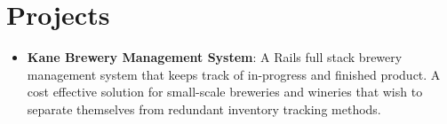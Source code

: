 \documentclass[letterpaper,11pt]{article}
\newcommand{\resumeItem}[2]{
  \item\small{
    \textbf{#1}{: #2 \vspace{-2pt}}
  }
}
\newcommand{\resumeSubItem}[2]{\resumeItem{#1}{#2}\vspace{-4pt}}
\newcommand{\resumeSubHeadingListStart}{\begin{itemize}[leftmargin=*]}
\newcommand{\resumeSubHeadingListEnd}{\end{itemize}}
\begin{document}
\section{Projects}
  \resumeSubHeadingListStart
    \resumeSubItem{Kane Brewery Management System}
      {A Rails full stack brewery management system that keeps track of in-progress and finished product. A cost effective solution for small-scale breweries and wineries that wish to separate themselves from redundant inventory tracking methods.}
  \resumeSubHeadingListEnd

%


\end{document}
